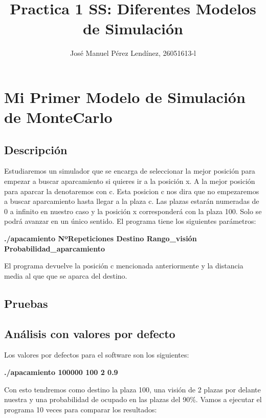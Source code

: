 \documentclass[]{article}
\title{Practica 1 SS: Diferentes Modelos de Simulación}
\author{José Manuel Pérez Lendínez, 26051613-l}
\begin{document}
	
	\maketitle
	
	
	\newpage
	\tableofcontents
	\newpage
	
\section{Mi Primer Modelo de Simulación de MonteCarlo}
\subsection{Descripción}
Estudiaremos un simulador que se encarga de seleccionar la mejor posición para empezar a buscar aparcamiento si quieres ir a la posición x. A la mejor posición para aparcar la denotaremos con c. Esta posicion c nos dira que no empezaremos a buscar aparcamiento hasta llegar a la plaza c. Las plazas estarán numeradas de 0 a infinito en nuestro caso y la posición x corresponderá con la plaza 100. Solo se podrá avanzar en un único sentido.
El programa tiene los siguientes parámetros:
\newline

	\textbf{./apacamiento NºRepeticiones Destino Rango\_visión Probabilidad\_aparcamiento}
\newline

El programa devuelve la posición c mencionada anteriormente y la distancia media al que que se aparca del destino.

\subsection{Pruebas}
 \subsection{Análisis con valores por defecto}
 Los valores por defectos para el software son los siguientes: 
 
 \textbf{./apacamiento 100000 100 2 0.9}
 \newline
 
 Con esto tendremos como destino la plaza 100, una visión de 2 plazas por delante nuestra y una probabilidad de ocupado en las plazas del 90\%.
 Vamos a ejecutar el programa 10 veces para comparar los resultados:
 
\end{document}
